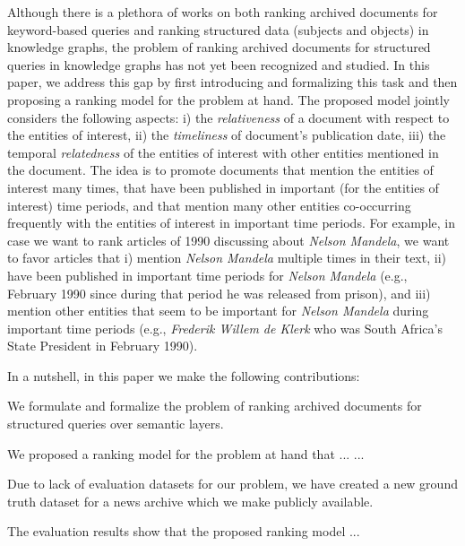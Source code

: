 \documentclass{libtex/llncs}
\newcommand{\draft}[1]{{\color{red}#1}}
\begin{document}
Although there is a plethora of works on both
ranking archived documents for keyword-based queries
and ranking structured data (subjects and objects) in knowledge graphs,
the problem of ranking archived documents for structured queries in knowledge graphs
has not yet been recognized and studied.
In this paper, we address this gap by first introducing and formalizing this task
and then proposing a ranking model for the problem at hand.
The proposed model jointly considers the following aspects:
i) the {\em relativeness} of a document with respect to the entities of interest,
ii) the {\em timeliness} of document's publication date,
iii) the temporal {\em relatedness} of the entities of interest with other entities
mentioned in the document.
The idea is to promote documents that
mention the entities of interest many times,
that have been published in important (for the entities of interest) time periods, and that
mention many other entities co-occurring frequently
with the entities of interest in important time periods.
For example, in case we want to rank articles of 1990
discussing about {\em Nelson Mandela},
we want to favor articles that
i) mention {\em Nelson Mandela} multiple times in their text,
ii) have been published in important time periods for {\em Nelson Mandela}
(e.g., February 1990 since during that period he was released from prison), and
iii) mention other entities that seem to be important for {\em Nelson Mandela}
during important time periods
(e.g., {\em Frederik Willem de Klerk} who was
South Africa's State President in February 1990).

In a nutshell, in this paper we make the following contributions:
\begin{compactitem}
\item   We formulate and formalize the problem of ranking archived documents
        for structured queries over semantic layers.
\item   \draft{We proposed a ranking model for the problem at hand that ... ...}
\item   Due to lack of evaluation datasets for our problem, we have created
        a new ground truth dataset for a news archive which we make publicly available.
\item   \draft{The evaluation results show that the proposed ranking model ...}
\end{compactitem}
\end{document}
